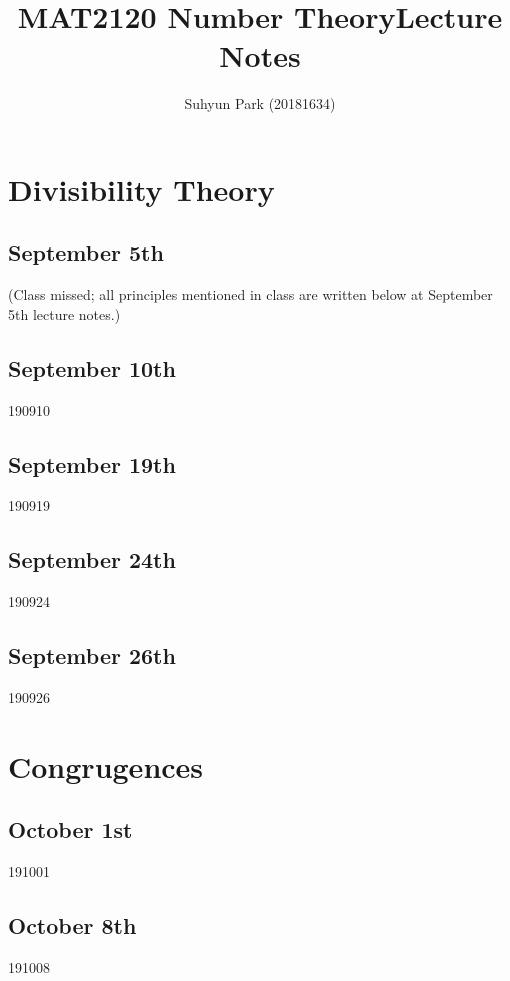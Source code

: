 
\usetikzlibrary{angles,patterns,calc}



\title{MAT2120 Number Theory\newline\space Lecture Notes}
\author{Suhyun Park (20181634)}

\maketitle

\section{Divisibility Theory}
\subsection{September 5th}
(Class missed; all principles mentioned in class are written below at September 5th lecture notes.)

\subsection{September 10th}
{190910}

\subsection{September 19th}
{190919}

\subsection{September 24th}
{190924}

\subsection{September 26th}
{190926}

\section{Congrugences}
\subsection{October 1st}
{191001}

\subsection{October 8th}
{191008}

